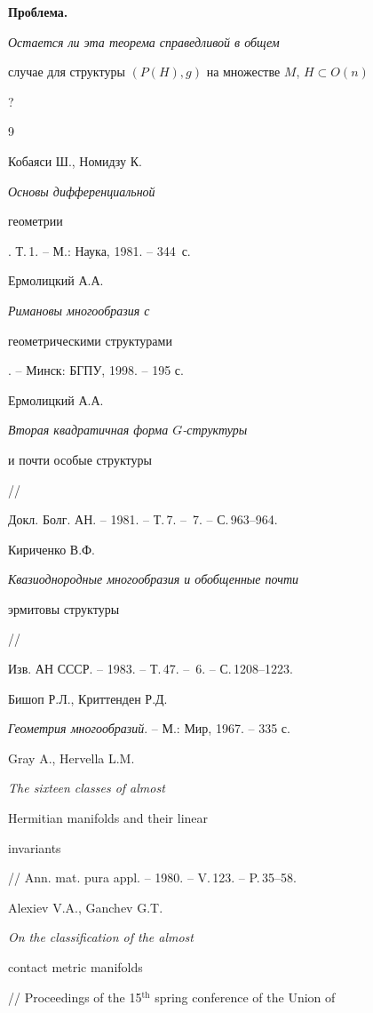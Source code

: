  


{\bf Проблема.} {\it Остается ли эта теорема справедливой в общем 


случае для структуры $(P(H),g)$ на множестве $M$, $H\subset O(n)$}? 


 


 


\begin{thebibliography}{9} 


 




Кобаяси Ш., Номидзу К. {\em Основы дифференциальной 


геометрии}. Т.\,1. -- М.: Наука, 1981. -- 344~с. 




Ермолицкий А.А. {\em Римановы многообразия с 


геометрическими структурами}. -- Минск: БГПУ, 1998. -- 195 с. 




Ермолицкий А.А. {\em Вторая квадратичная форма $G$-структуры 


и почти особые структуры} // 


Докл. Болг. АН. -- 1981. -- Т.\,7. -- \No\,7. -- С.\,963--964. 




Кириченко В.Ф. {\em Квазиоднородные многообразия и обобщенные почти 


эрмитовы структуры} // 


Изв. АН СССР. -- 1983. -- Т.\,47. -- \No\,6. -- С.\,1208--1223. 




Бишоп Р.Л., Криттенден Р.Д. 


{\em Геометрия многообразий}. -- М.: Мир, 1967. -- 335 с. 




Gray A., Hervella L.M. {\em The sixteen classes of almost 


Hermitian manifolds and their linear 


invariants} // Ann. mat. pura appl. -- 1980. -- V.\,123. -- P.\,35--58. 




Alexiev V.A., Ganchev G.T. {\em On the classification of the almost 


contact metric manifolds} 


// Proceedings of the 15$^{\mathrm{th}}$ spring conference of the Union of 



\end{thebibliography}
